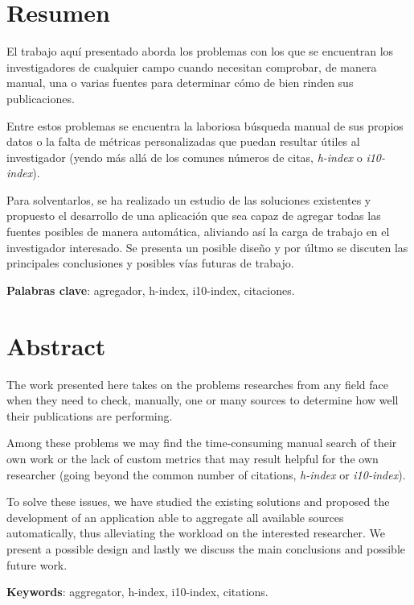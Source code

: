 \chapter*{Resumen}
\thispagestyle{empty}

El trabajo aquí presentado aborda los problemas con los que se encuentran los investigadores de cualquier campo cuando necesitan comprobar, de manera manual, una o varias fuentes para determinar cómo de bien rinden sus publicaciones.

Entre estos problemas se encuentra la laboriosa búsqueda manual de sus propios datos o la falta de métricas personalizadas que puedan resultar útiles al investigador (yendo más allá de los comunes números de citas, \emph{h-index} o \emph{i10-index}).

Para solventarlos, se ha realizado un estudio de las soluciones existentes y propuesto el desarrollo de una aplicación que sea capaz de agregar todas las fuentes posibles de manera automática, aliviando así la carga de trabajo en el investigador interesado. Se presenta un posible diseño y por últmo se discuten las principales conclusiones y posibles vías futuras de trabajo.

\textbf{Palabras clave}: agregador, h-index, i10-index, citaciones.

\thispagestyle{empty}

\chapter*{Abstract}

The work presented here takes on the problems researches from any field face when they need to check, manually, one or many sources to determine how well their publications are performing.

Among these problems we may find the time-consuming manual search of their own work or the lack of custom metrics that may result helpful for the own researcher (going beyond the common number of citations, \emph{h-index} or \emph{i10-index}).

To solve these issues, we have studied the existing solutions and proposed the development of an application able to aggregate all available sources automatically, thus alleviating the workload on the interested researcher. We present a possible design and lastly we discuss the main conclusions and possible future work.

\textbf{Keywords}: aggregator, h-index, i10-index, citations.

\thispagestyle{empty}
